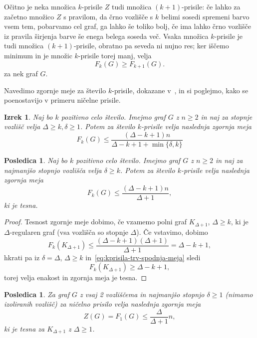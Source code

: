 \documentclass[12pt,a4paper,twoside]{article}
\theoremstyle{definition} %
\theoremstyle{plain} %
\newtheorem{izrek}[definicija]{Izrek}
\newtheorem{posledica}[definicija]{Posledica}
\numberwithin{equation}{section}  %
\begin{document}
Očitno je neka množica $k$-prisile $Z$ tudi množica $(k+1)$-prisile: če lahko za začetno množico $Z$ s pravilom, da črno vozlišče s $k$ belimi sosedi spremeni barvo vsem tem, pobarvamo cel graf, ga lahko še toliko bolj, če ima lahko črno vozlišče iz pravila širjenja barve še enega belega soseda več. Vsaka množica $k$-prisile je tudi množica $(k+1)$-prisile, obratno pa seveda ni nujno res; ker iščemo minimum in je množic $k$-prisile torej manj, velja
\[ F_{k}(G) \geq F_{k+1}(G). \]
za nek graf $G$.

Navedimo zgornje meje za število $k$-prisile, dokazane v~\cite{amos2015kforcing}, in si poglejmo, kako se poenostavijo v primeru ničelne prisile.

\begin{izrek}{\cite[izrek 3.4]{amos2015kforcing}}
    Naj bo $k$ pozitivno celo število. Imejmo graf $G$ z $n \geq 2$ in naj za stopnje vozlišč velja $\Delta \geq k, \delta \geq 1$. Potem za število $k$-prisile velja naslednja zgornja meja
    \begin{equation}
        \label{eq:kprisila-zgornja-meja}
        F_k(G) \leq \frac{(\Delta - k + 1)n}{\Delta - k + 1 + \min\{\delta,k\}}
    \end{equation}
\end{izrek}

\begin{posledica}
    Naj bo $k$ pozitivno celo število. Imejmo graf $G$ z $n \geq 2$ in naj za najmanjšo stopnjo vozlišča velja $\delta \geq k$. Potem za število $k$-prisile velja naslednja zgornja meja
    \[ F_k(G) \leq \frac{(\Delta - k + 1) n}{\Delta + 1}, \]
    ki je tesna.
\end{posledica}
\begin{proof}
    Tesnost zgornje meje dobimo, če vzamemo polni graf $K_{\Delta + 1}$, $\Delta \geq k$, ki je $\Delta$-regularen graf (vsa vozlišča so stopnje $\Delta$). Če vstavimo, dobimo
    \[ F_k(K_{\Delta + 1}) \leq \frac{(\Delta - k + 1) (\Delta + 1)}{\Delta + 1} = \Delta - k +1, \]
    hkrati pa iz $\delta = \Delta$, $\Delta \geq k$ in~\eqref{eq:kprisila-trv-spodnja-meja} sledi
    \[ F_k(K_{\Delta + 1}) \geq \Delta - k +1, \]
    torej velja enakost in zgornja meja je tesna.
\end{proof}

\begin{posledica}
    Za graf $G$ z vsaj 2 vozliščema in najmanjšo stopnjo $\delta \geq 1$ (nimamo izoliranih vozlišč) za ničelno prisilo velja naslednja zgornja meja
    \begin{equation}
        \label{eq:zgornja-meja-zf}
        Z(G) = F_1(G) \leq \frac{\Delta}{\Delta + 1} n,
    \end{equation}
    ki je tesna za $K_{\Delta + 1}$ z $\Delta \geq 1$.
\end{posledica}
\end{document}
